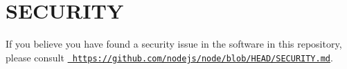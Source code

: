 \chapter{SECURITY}
\hypertarget{md__2_users_2hello_2_documents_2_git_hub_2finalproject-engine-drop-table-engines_2_engine_2src_2de851f0355a3fe8c1ecfb51466f2b117}{}\label{md__2_users_2hello_2_documents_2_git_hub_2finalproject-engine-drop-table-engines_2_engine_2src_2de851f0355a3fe8c1ecfb51466f2b117}
If you believe you have found a security issue in the software in this repository, please consult \href{https://github.com/nodejs/node/blob/HEAD/SECURITY.md}{\texttt{ https\+://github.\+com/nodejs/node/blob/\+HEAD/\+SECURITY.\+md}}. 